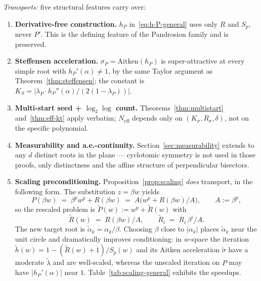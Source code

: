 \documentclass[11pt,a4paper]{article}
\theoremstyle{definition}
\begin{document}
\emph{Transports:} five structural features carry over:
\begin{enumerate}
  \item \textbf{Derivative-free construction.} $h_P$ in~\eqref{eq:h-P-general} uses only $R$ and $S_p$, never $P'$. This is the defining feature of the Pandrosion family and is preserved.
  \item \textbf{Steffensen acceleration.} $\sigma_P = \mathrm{Aitken}(h_P)$ is super-attractive at every simple root with $h_P'(\alpha) \neq 1$, by the same Taylor argument as Theorem~\ref{thm:steffensen}; the constant is $K_S = |\lambda_P \cdot h_P''(\alpha)/(2(1 - \lambda_P))|$.
  \item \textbf{Multi-start seed + $\log_2\log$ count.} Theorems~\ref{thm:multistart} and~\ref{thm:eff-kt} apply verbatim; $N_{\mathrm{eff}}$ depends only on $(K_\sigma, R_\sigma, \delta)$, not on the specific polynomial.
  \item \textbf{Measurability and a.e.-continuity.} Section~\ref{sec:measurability} extends to any $d$ distinct roots in the plane --- cyclotomic symmetry is not used in those proofs, only distinctness and the affine structure of perpendicular bisectors.
  \item \textbf{Scaling preconditioning.} Proposition~\ref{prop:scaling} \emph{does} transport, in the following form. The substitution $z = \beta w$ yields
  \[
    P(\beta w) \;=\; \beta^p w^p + R(\beta w) \;=\; A\bigl(w^p + R(\beta w)/A\bigr), \qquad A := \beta^p,
  \]
  so the rescaled problem is $\tilde P(w) := w^p + \tilde R(w)$ with
  \[
    \tilde R(w) \;=\; R(\beta w)/A, \qquad \tilde R_i \;=\; R_i\,\beta^i/A.
  \]
  The new target root is $\tilde \alpha_k = \alpha_k/\beta$. Choosing $\beta$ close to $|\alpha_k|$ places $\tilde \alpha_k$ near the unit circle and dramatically improves conditioning: in $w$-space the iteration $\tilde h(w) = 1 - (\tilde R(w) + 1)/S_p(w)$ and its Aitken acceleration $\tilde \sigma$ have a moderate $\tilde \lambda$ and are well-scaled, whereas the unscaled iteration on $P$ may have $|h_P'(\alpha)|$ near $1$. Table~\ref{tab:scaling-general} exhibits the speedups.


\end{enumerate}
\end{document}
